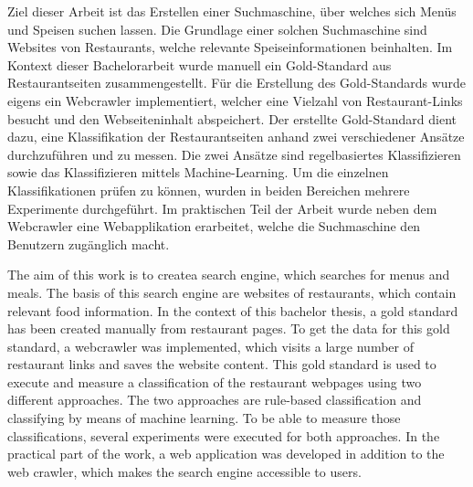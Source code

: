 
Ziel dieser Arbeit ist das Erstellen einer Suchmaschine, über welches sich Menüs und Speisen suchen lassen.
Die Grundlage einer solchen Suchmaschine sind Websites von Restaurants, welche relevante Speiseinformationen beinhalten.
Im Kontext dieser Bachelorarbeit wurde manuell ein Gold-Standard aus Restaurantseiten zusammengestellt.
Für die Erstellung des Gold-Standards wurde eigens ein Webcrawler implementiert, welcher eine Vielzahl von Restaurant-Links besucht und den Webseiteninhalt abspeichert.
Der erstellte Gold-Standard dient dazu, eine Klassifikation der Restaurantseiten anhand zwei verschiedener Ansätze durchzuführen und zu messen.
Die zwei Ansätze sind regelbasiertes Klassifizieren sowie das Klassifizieren mittels Machine-Learning.
Um die einzelnen Klassifikationen prüfen zu können, wurden in beiden Bereichen mehrere Experimente durchgeführt.
Im praktischen Teil der Arbeit wurde neben dem Webcrawler eine Webapplikation erarbeitet, welche die Suchmaschine den Benutzern zugänglich macht.

The aim of this work is to createa search engine, which searches for menus and meals.
The basis of this search engine are websites of restaurants, which contain relevant food information.
In the context of this bachelor thesis, a gold standard has been created manually from restaurant pages.
To get the data for this gold standard, a webcrawler was implemented, which visits a large number of restaurant links and saves the website content.
This gold standard is used to execute and measure a classification of the restaurant webpages using two different approaches.
The two approaches are rule-based classification and classifying by means of machine learning.
To be able to measure those classifications, several experiments were executed for both approaches.
In the practical part of the work, a web application was developed in addition to the web crawler, which makes the search engine accessible to users.
